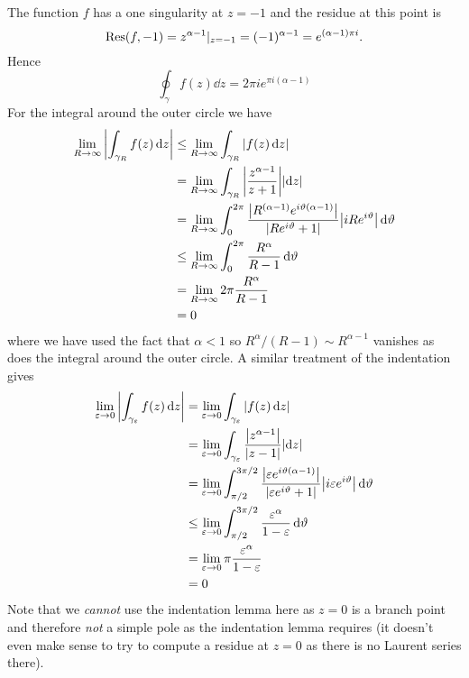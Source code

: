 \documentclass{article}
\begin{document}
\begin{example}
        The function \(f\) has a one singularity at \(z = -1\) and the residue at this point is
        \[\Res(f, -1) = z^{\alpha - 1}|_{z = -1} = (-1)^{\alpha - 1} = e^{(\alpha - 1)\pi i}.\]
        Hence
        \[\oint_{\gamma} f(z) \dd{z} = 2\pi ie^{\pi i(\alpha - 1)}\]
        For the integral around the outer circle we have
        \begin{align*}
            \lim_{R\to\infty} \abs{\int_{\gamma_R} f(z)\dd{z}} &\le \lim_{R\to\infty} \int_{\gamma_R} \abs{f(z)\dd{z}}\\
            &= \lim_{R\to\infty} \int_{\gamma_R} \abs{\frac{z^{\alpha - 1}}{z + 1}}\abs{\dd{z}}\\
            &= \lim_{R\to\infty} \int_{0}^{2\pi} \frac{\abs{R^{(\alpha - 1)}e^{i\vartheta(\alpha - 1)}}}{\abs{Re^{i\vartheta} + 1}}\abs{iRe^{i\vartheta}}\dd{\vartheta}\\
            &\le \lim_{R\to\infty} \int_{0}^{2\pi} \frac{R^\alpha}{R - 1}\dd{\vartheta}\\
            &= \lim_{R\to\infty} 2\pi \frac{R^{\alpha}}{R - 1}\\
            &= 0
        \end{align*}
        where we have used the fact that \(\alpha < 1\) so \(R^{\alpha}/(R - 1) \sim R^{\alpha - 1}\) vanishes as does the integral around the outer circle.
        A similar treatment of the indentation gives
        \begin{align*}
            \lim_{\varepsilon\to0} \abs{\int_{\gamma_\varepsilon} f(z)\dd{z}} &= \lim_{\varepsilon\to0} \int_{\gamma_\varepsilon} \abs{f(z)\dd{z}}\\
            &= \lim_{\varepsilon\to0} \int_{\gamma_\varepsilon} \frac{\abs{z^{\alpha - 1}}}{\abs{z - 1}} \abs{\dd{z}}\\
            &= \lim_{\varepsilon\to0} \int_{\pi/2}^{3\pi/2} \frac{\abs{\varepsilon e^{i\vartheta(\alpha - 1)}}}{\abs{\varepsilon e^{i\vartheta} + 1}}\abs{i\varepsilon e^{i\vartheta}}\dd{\vartheta}\\
            &\le \lim_{\varepsilon\to0} \int_{\pi/2}^{3\pi/2} \frac{\varepsilon^{\alpha}}{1 - \varepsilon} \dd{\vartheta}\\
            &= \lim_{\varepsilon\to0} \pi \frac{\varepsilon^{\alpha}}{1 - \varepsilon}\\
            &= 0
        \end{align*}
        Note that we \emph{cannot} use the indentation lemma here as \(z = 0\) is a branch point and therefore \emph{not} a simple pole as the indentation lemma requires (it doesn't even make sense to try to compute a residue at \(z = 0\) as there is no Laurent series there).
        

\end{example}
\end{document}

